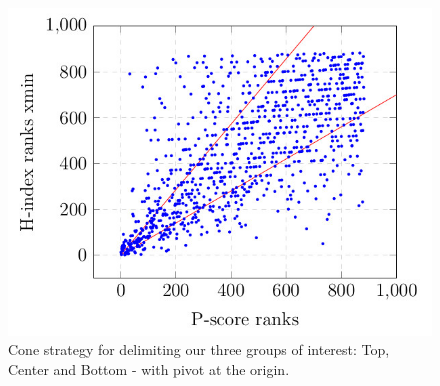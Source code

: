 \documentclass[man]{apa6}
\begin{document}
\begin{figure}[h!]
  \begin{center}
    \centerline{\includegraphics[scale=0.4]{cone_strategy}}

    \caption{Cone strategy for delimiting our three groups of interest: Top, Center and Bottom - with pivot at the origin.}
    \label{fig:cone_strategy}
  \end{center}
\end{figure}
\end{document}
